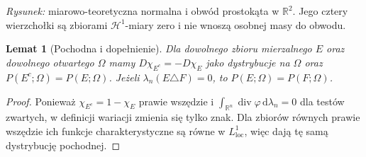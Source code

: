 \documentclass[11pt,a4paper,oneside]{book}
\numberwithin{equation}{chapter}
\theoremstyle{plain}
\newtheorem{lemat}[twierdzenie]{Lemat}
\theoremstyle{definition}
\theoremstyle{remark}
\begin{document}
\begin{center}
\end{center}
\noindent\emph{Rysunek:} miarowo-teoretyczna normalna i obwód
prostokąta w $\mathbb R^2$. Jego cztery wierzchołki
są zbiorami $\mathcal H^1$-miary zero i nie wnoszą
osobnej masy do obwodu.

\begin{lemat}[Pochodna i dopełnienie]
\label{lem:perimeter-complement-29}
Dla dowolnego zbioru mierzalnego $E$ oraz dowolnego
otwartego $\Omega$ mamy
$D\chi_{E^c}=-D\chi_E$ jako dystrybucje na $\Omega$
oraz $P(E^c;\Omega)=P(E;\Omega)$.
Jeżeli $\lambda_n(E\triangle F)=0$,
to $P(E;\Omega)=P(F;\Omega)$.
\end{lemat}
\begin{proof}
Ponieważ $\chi_{E^c}=1-\chi_E$ prawie wszędzie
i $\int_{\mathbb R^n}\operatorname{div}\varphi
\,\mathrm d\lambda_n=0$ dla testów zwartych,
w definicji wariacji zmienia się tylko znak.
Dla zbiorów równych prawie wszędzie ich funkcje
charakterystyczne są równe w $L^1_{\mathrm{loc}}$,
więc dają tę samą dystrybucję pochodnej.
\end{proof}
\end{document}
